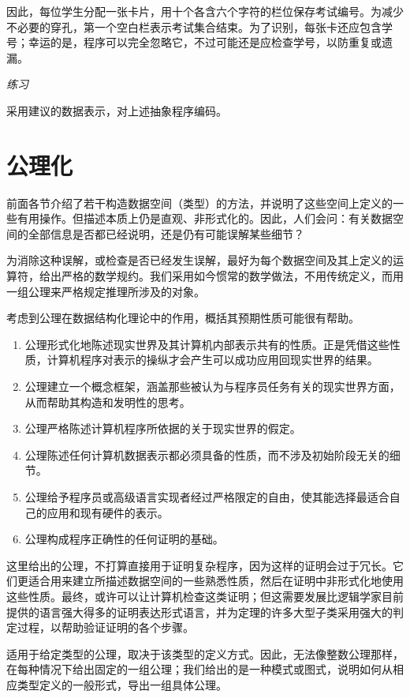 \documentclass[twoside,11pt,fontset=none]{ctexbook}
\begin{document}
因此，每位学生分配一张卡片，用十个各含六个字符的栏位保存考试编号。为减少不必要的穿孔，第一个空白栏表示考试集合结束。为了识别，每张卡还应包含学号；幸运的是，程序可以完全忽略它，不过可能还是应检查学号，以防重复或遗漏。

\noindent
\textit{练习}
\nopagebreak

\noindent
采用建议的数据表示，对上述抽象程序编码。
\section{公理化}

前面各节介绍了若干构造数据空间（类型）的方法，并说明了这些空间上定义的一些有用操作。但描述本质上仍是直观、非形式化的。因此，人们会问：有关数据空间的全部信息是否都已经说明，还是仍有可能误解某些细节？

为消除这种误解，或检查是否已经发生误解，最好为每个数据空间及其上定义的运算符，给出严格的数学规约。我们采用如今惯常的数学做法，不用传统定义，而用一组公理来严格规定推理所涉及的对象。

考虑到公理在数据结构化理论中的作用，概括其预期性质可能很有帮助。

\begin{enumerate}[wide, nosep, label=(\arabic*)]
	\item 公理形式化地陈述现实世界及其计算机内部表示共有的性质。正是凭借这些性质，计算机程序对表示的操纵才会产生可以成功应用回现实世界的结果。
	\item 公理建立一个概念框架，涵盖那些被认为与程序员任务有关的现实世界方面，从而帮助其构造和发明性的思考。
	\item 公理严格陈述计算机程序所依据的关于现实世界的假定。
	\item 公理陈述任何计算机数据表示都必须具备的性质，而不涉及初始阶段无关的细节。
	\item 公理给予程序员或高级语言实现者经过严格限定的自由，使其能选择最适合自己的应用和现有硬件的表示。
	\item 公理构成程序正确性的任何证明的基础。
\end{enumerate}

这里给出的公理，不打算直接用于证明复杂程序，因为这样的证明会过于冗长。它们更适合用来建立所描述数据空间的一些熟悉性质，然后在证明中非形式化地使用这些性质。最终，或许可以让计算机检查这类证明；但这需要发展比逻辑学家目前提供的语言强大得多的证明表达形式语言，并为定理的许多大型子类采用强大的判定过程，以帮助验证证明的各个步骤。

适用于给定类型的公理，取决于该类型的定义方式。因此，无法像整数公理那样，在每种情况下给出固定的一组公理；我们给出的是一种模式或图式，说明如何从相应类型定义的一般形式，导出一组具体公理。
\end{document}
